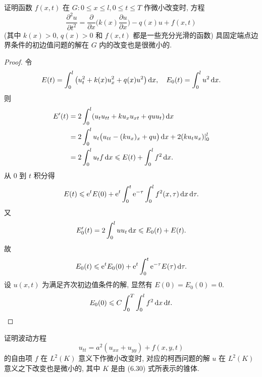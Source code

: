 \begin{exercise}
  证明函数 $f(x,t)$ 在 $G\colon 0\leq x\leq l, 0\leq t\leq T$ 作微小改变时, 方程
  \[\frac{\partial^2 u}{\partial t^2}
    = \frac{\partial}{\partial x}\biggl(k(x)\frac{\partial u}{\partial x}\biggr)
      -q(x)u + f(x,t)\]
  (其中 $k(x)>0$, $q(x)>0$ 和 $f(x,t)$ 都是一些充分光滑的函数)
  具固定端点边界条件的初边值问题的解在 $G$ 内的改变也是很微小的.
\end{exercise}

\begin{proof}
  令
  \[E(t)=\int_0^l\left(u_t^2+k(x)u_x^2+q(x)u^2\right)\mathop{}\!\mathrm{d} x,
    \quad E_0(t)=\int_0^lu^2\mathop{}\!\mathrm{d} x.\]
  则
  \[\begin{split}
    E'(t)
    & = 2\int_0^l(u_tu_{tt}+ku_xu_{xt}+quu_t)\mathop{}\!\mathrm{d} x \\
    & = 2\int_0^lu_t\bigl(u_{tt}-(ku_x)_x+qu\bigr)\mathop{}\!\mathrm{d} x+2(ku_tu_x)|_0^l \\
    & = 2\int_0^lu_tf\mathop{}\!\mathrm{d} x\leqslant E(t)+\int_0^lf^2\mathop{}\!\mathrm{d} x.
  \end{split}\]
  从 $0$ 到 $t$ 积分得
  \[E(t)\leqslant \mathrm{e}^tE(0)+\mathrm{e}^t\int_0^t\mathrm{e}^{-\tau}\int_0^lf^2(x,\tau)\mathop{}\!\mathrm{d} x\mathop{}\!\mathrm{d}\tau.\]
  又
  \[E'_0(t) = 2\int_0^l uu_t \mathop{}\!\mathrm{d} x\leqslant E_0(t) + E(t).\]
  故
  \[E_0(t)\leqslant \mathrm{e}^t E_0(0) + \mathrm{e}^t\int_0^t \mathrm{e}^{-\tau} E(\tau) \mathop{}\!\mathrm{d}\tau.\]
  设 $u(x,t)$ 为满足齐次初边值条件的解, 显然有 $E(0)=E_0(0)=0$.
  \[E_0(0) \leqslant C\int_0^T \int_0^l f^2 \mathop{}\!\mathrm{d} x\mathop{}\!\mathrm{d} t.\qedhere\]
\end{proof}


\begin{exercise}
  证明波动方程
  \[u_{tt} = a^2(u_{xx}+u_{yy}) + f(x,y,t)\]
  的自由项 $f$ 在 $L^2(K)$ 意义下作微小改变时, 对应的柯西问题的解 $u$ 在
  $L^2(K)$ 意义之下改变也是微小的, 其中 $K$ 是由 (6.30) 式所表示的锥体.
\end{exercise}

